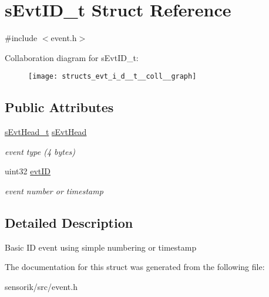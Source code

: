 \hypertarget{structs_evt_i_d__t}{}\section{s\+Evt\+I\+D\+\_\+t Struct Reference}
\label{structs_evt_i_d__t}


{\ttfamily \#include $<$event.\+h$>$}



Collaboration diagram for s\+Evt\+I\+D\+\_\+t\+:\nopagebreak
\begin{figure}[H]
\begin{center}
\leavevmode
\texttt{[image: structs\_evt\_i\_d\_\_t\_\_coll\_\_graph]}
\end{center}
\end{figure}
\subsection*{Public Attributes}
\begin{DoxyCompactItemize}
\item 
\mbox{\label{structs_evt_i_d__t_a4b7fa59d71f8c58156cfcf630043a53d}} 
\mbox{\hyperlink{structs_evt_head__t}{s\+Evt\+Head\+\_\+t}} \mbox{\hyperlink{structs_evt_i_d__t_a4b7fa59d71f8c58156cfcf630043a53d}{s\+Evt\+Head}}
\begin{DoxyCompactList}\small\item\em event type (4 bytes) \end{DoxyCompactList}\item 
\mbox{\label{structs_evt_i_d__t_a25efff58a7f576e7eb3fd136d2705b70}} 
uint32 \mbox{\hyperlink{structs_evt_i_d__t_a25efff58a7f576e7eb3fd136d2705b70}{evt\+ID}}
\begin{DoxyCompactList}\small\item\em event number or timestamp \end{DoxyCompactList}\end{DoxyCompactItemize}


\subsection{Detailed Description}
Basic ID event using simple numbering or timestamp 

The documentation for this struct was generated from the following file\+:\begin{DoxyCompactItemize}
\item 
sensorik/src/event.\+h\end{DoxyCompactItemize}
